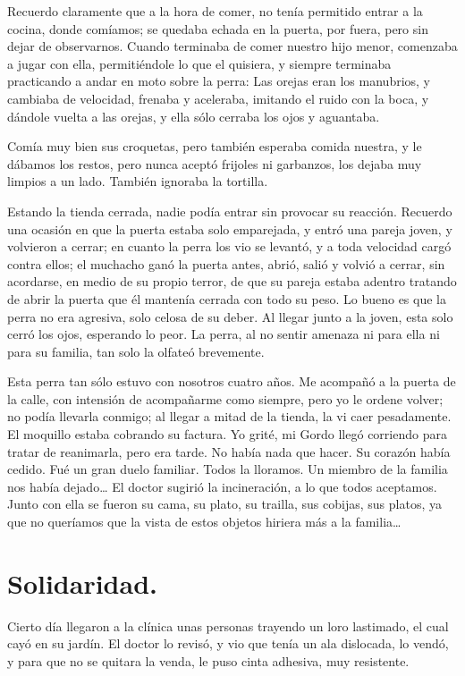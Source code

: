 \documentclass[letterpaper, 12pt]{book}
\begin{document}
Recuerdo claramente que a la hora de comer, no tenía permitido entrar a la cocina, donde comíamos; se quedaba echada en la puerta, por fuera, pero sin dejar de observarnos. Cuando terminaba de comer nuestro hijo menor, comenzaba a jugar con ella, permitiéndole lo que el quisiera, y siempre terminaba practicando a andar en moto sobre la perra: Las orejas eran los manubrios, y cambiaba de velocidad, frenaba y aceleraba, imitando el ruido con la boca, y dándole vuelta a las orejas, y ella sólo cerraba los ojos y aguantaba.

Comía muy bien sus croquetas, pero también esperaba comida nuestra, y le dábamos los restos, pero nunca aceptó frijoles ni garbanzos, los dejaba muy limpios a un lado. También ignoraba la tortilla.

Estando la tienda cerrada, nadie podía entrar sin provocar su reacción. Recuerdo una ocasión en que la puerta estaba solo emparejada, y entró una pareja joven, y volvieron a cerrar; en cuanto la perra los vio se levantó, y a toda velocidad cargó contra ellos; el muchacho ganó la puerta antes, abrió, salió y volvió a cerrar, sin acordarse, en medio de su propio terror, de que su pareja estaba adentro tratando de abrir la puerta que él mantenía cerrada con todo su peso. Lo bueno es que la perra no era agresiva, solo celosa de su deber. Al llegar junto a la joven, esta solo cerró los ojos, esperando lo peor. La perra, al no sentir amenaza ni para ella ni para su familia, tan solo la olfateó brevemente.

Esta perra tan sólo estuvo con nosotros cuatro años. Me acompañó a la puerta de la calle, con intensión de acompañarme como siempre, pero yo le ordene volver; no podía llevarla conmigo; al llegar a mitad de la tienda, la vi caer pesadamente. El moquillo estaba cobrando su factura. Yo grité, mi Gordo llegó corriendo para tratar de reanimarla, pero era tarde. No había nada que hacer. Su corazón había cedido. Fué un gran duelo familiar. Todos la lloramos. Un miembro de la familia nos había dejado\ldots
El doctor sugirió la incineración, a lo que todos aceptamos. Junto con ella se fueron su cama, su plato, su trailla, sus cobijas, sus platos, ya que no queríamos que la vista de estos objetos hiriera más a la familia\ldots


\chapter{Solidaridad.}

Cierto día llegaron a la clínica unas personas trayendo un loro lastimado, el cual cayó en su jardín. El doctor lo revisó, y vio que tenía un ala dislocada, lo vendó, y para que no se quitara la venda, le puso cinta adhesiva, muy resistente. 
\end{document}

